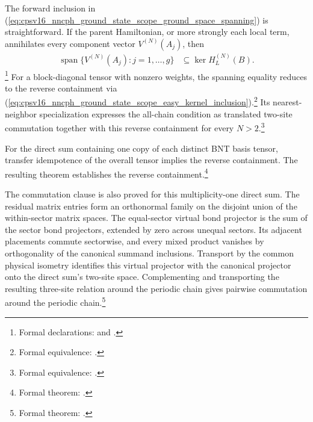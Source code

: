 \documentclass{article}
\begin{document}
The forward inclusion in
(\ref{eq:cpsv16_nncph_ground_state_scope_ground_space_spanning}) is
straightforward. If the parent Hamiltonian, or more strongly each local term,
annihilates every component vector $V^{(N)}(A_j)$, then
\begin{align}
    \operatorname{span}
    \{V^{(N)}(A_j):j=1,\ldots,g\}
        &\subseteq
        \ker H_L^{(N)}(B).
    \label{eq:cpsv16_nncph_ground_state_scope_easy_kernel_inclusion}
\end{align}
\footnote{Formal declarations:
and
.}
For a block-diagonal tensor with nonzero weights, the spanning equality reduces
to the reverse containment via
(\ref{eq:cpsv16_nncph_ground_state_scope_easy_kernel_inclusion}).\footnote{Formal
equivalence:
.}
Its nearest-neighbor specialization expresses the all-chain condition as
translated two-site commutation together with this reverse containment for
every $N>2$.\footnote{Formal equivalence:
.}

For the direct sum containing one copy of each distinct BNT basis tensor,
transfer idempotence of the overall tensor implies the reverse containment. The
resulting theorem establishes the reverse containment.\footnote{Formal theorem:
.}

The commutation clause is also proved for this multiplicity-one direct sum.
The residual matrix entries form an orthonormal family on the disjoint union
of the within-sector matrix spaces. The equal-sector virtual bond projector
is the sum of the sector bond projectors, extended by zero across unequal
sectors. Its adjacent placements commute sectorwise, and every mixed product
vanishes by orthogonality of the canonical summand inclusions. Transport by
the common physical isometry identifies this virtual projector with the
canonical projector onto the direct sum's two-site space. Complementing and
transporting the resulting three-site relation around the periodic chain
gives pairwise commutation around the periodic chain.\footnote{Formal theorem:
.}
\end{document}
